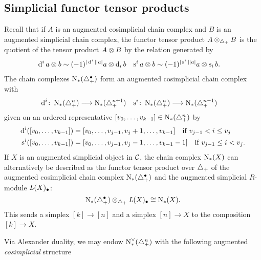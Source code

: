 

\subsection{Simplicial functor tensor products}
Recall that if $A$ is an augmented cosimplicial chain complex and $B$ is an augmented simplicial chain complex, the functor tensor product $A \otimes_{\triangle_{+}} B$ is the quotient of the tensor product $A \otimes B$ by the relation generated by
\begin{align*}
	\operatorname{d}^i a \otimes b &\sim (-1)^{|\operatorname{d}^i||a|}a \otimes \operatorname{d}_i b
	&
	\operatorname{s}^ia \otimes b &\sim (-1)^{|\operatorname{s}^i||a|}a \otimes \operatorname{s}_ib.
\end{align*}
The chain complexes $\operatorname{N}_{*}(\triangle_{+}^\bullet)$ form an augmented cosimplicial chain complex with
\begin{align*}
	\operatorname{d}^i \colon \operatorname{N}_{*}(\triangle_{+}^n)& \longrightarrow \operatorname{N}_{*}(\triangle_{+}^{n+1})
	&
	\operatorname{s}^i \colon \operatorname{N}_{*}(\triangle_{+}^{n})& \longrightarrow \operatorname{N}_{*}(\triangle_{+}^{n-1})
\end{align*}
given on an ordered representative $[v_0,\dots,v_{k-1}]\in \operatorname{N}_{*}(\triangle_{+}^n)$ by
\begin{align*}
\operatorname{d}^i([v_0,\dots,v_{k-1}]) &= [v_0,\dots,v_{j-1},v_j+1,\dots,v_{k-1}] \quad \text{if $v_{j-1}<i\leq v_j$}
\\
\operatorname{s}^i([v_0,\dots,v_{k-1}]) &= [v_0,\dots,v_{j-1},v_j-1,\dots,v_{k-1}-1] \quad \text{if $v_{j-1} \leq i < v_j$}.
\end{align*}
If $X$ is an augmented simplicial object in $\mathcal{C}$, the chain complex $\operatorname{N}_{*}(X)$ can alternatively be described as the functor tensor product over $\triangle_{+}$ of the augmented cosimplicial chain complex $\operatorname{N}_{*}(\triangle_{+}^{\bullet})$ and the augmented simplicial $R$-module $\operatorname{{\it L}}(X)_\bullet$:
\begin{equation}\label{eq:1}
	\operatorname{N}_{*}(\triangle_{+}^\bullet) \otimes_{\triangle_{+}} \operatorname{{\it L}}(X)_\bullet \cong \operatorname{N}_{*}(X).
\end{equation}
This sends a simplex $[k] \to [n]$ and a simplex $[n] \to X$ to the composition $[k] \to X$.

Via Alexander duality, we may endow $\operatorname{N}^\vee_{*}(\triangle_{+}^n)$ with the following augmented \emph{cosimplicial} structure


